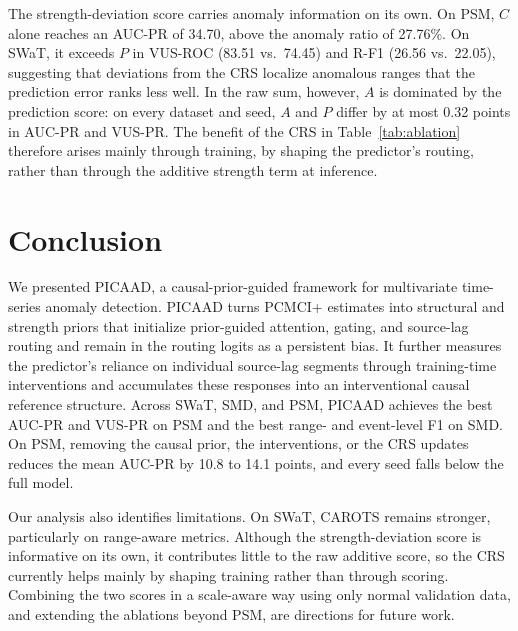 \documentclass[letterpaper]{article}
\begin{document}
The strength-deviation score carries anomaly information on its own. On PSM, $C$ alone reaches an AUC-PR of 34.70, above the anomaly ratio of 27.76\%. On SWaT, it exceeds $P$ in VUS-ROC (83.51 vs.\ 74.45) and R-F1 (26.56 vs.\ 22.05), suggesting that deviations from the CRS localize anomalous ranges that the prediction error ranks less well. In the raw sum, however, $A$ is dominated by the prediction score: on every dataset and seed, $A$ and $P$ differ by at most 0.32 points in AUC-PR and VUS-PR. The benefit of the CRS in Table~\ref{tab:ablation} therefore arises mainly through training, by shaping the predictor's routing, rather than through the additive strength term at inference.

\section{Conclusion}

We presented PICAAD, a causal-prior-guided framework for multivariate time-series anomaly detection. PICAAD turns PCMCI+ estimates into structural and strength priors that initialize prior-guided attention, gating, and source-lag routing and remain in the routing logits as a persistent bias. It further measures the predictor's reliance on individual source-lag segments through training-time interventions and accumulates these responses into an interventional causal reference structure. Across SWaT, SMD, and PSM, PICAAD achieves the best AUC-PR and VUS-PR on PSM and the best range- and event-level F1 on SMD. On PSM, removing the causal prior, the interventions, or the CRS updates reduces the mean AUC-PR by 10.8 to 14.1 points, and every seed falls below the full model.

Our analysis also identifies limitations. On SWaT, CAROTS remains stronger, particularly on range-aware metrics. Although the strength-deviation score is informative on its own, it contributes little to the raw additive score, so the CRS currently helps mainly by shaping training rather than through scoring. Combining the two scores in a scale-aware way using only normal validation data, and extending the ablations beyond PSM, are directions for future work.



\clearpage
\appendix
\end{document}
